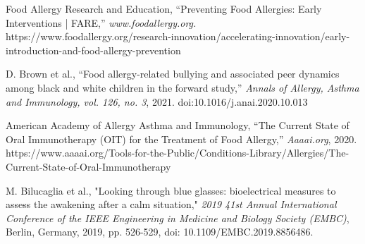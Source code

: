 \begin{thebibliography}{100}
    Food Allergy Research and Education, “Preventing Food Allergies: Early Interventions | FARE,” \textit{www.foodallergy.org.} https://www.foodallergy.org/research-innovation/accelerating-innovation/early-introduction-and-food-allergy-prevention
    
     D. Brown et al., “Food allergy-related bullying and associated peer dynamics among black and white children in the forward study,” \textit{Annals of Allergy, Asthma and Immunology, vol. 126, no. 3}, 2021. doi:10.1016/j.anai.2020.10.013
    
     American Academy of Allergy Asthma and Immunology, “The Current State of Oral Immunotherapy (OIT) for the Treatment of Food Allergy,” \textit{Aaaai.org}, 2020. https://www.aaaai.org/Tools-for-the-Public/Conditions-Library/Allergies/The-Current-State-of-Oral-Immunotherapy 

     M. Bilucaglia et al., "Looking through blue glasses: bioelectrical measures to assess the awakening after a calm situation," \textit{2019 41st Annual International Conference of the IEEE Engineering in Medicine and Biology Society (EMBC)}, Berlin, Germany, 2019, pp. 526-529, doi: 10.1109/EMBC.2019.8856486.
    
\end{thebibliography}